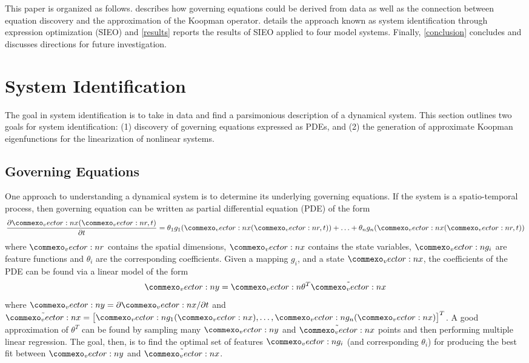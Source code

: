 \documentclass{article}
\renewcommand{\vec}[1]{\vect{#1}}
\begin{document}
This paper is organized as follows.  describes how governing equations could be derived from data as well as the connection between equation discovery and the approximation of the Koopman operator.  details the approach known as system identification through expression optimization (SIEO) and \cref{results} reports the results of SIEO applied to four model systems. Finally, \cref{conclusion} concludes and discusses directions for future investigation. 



\section{System Identification}
\label{systemidentification}

The goal in system identification is to take in data and find a parsimonious description of a dynamical system. This section outlines two goals for system identification: (1) discovery of governing equations expressed as PDEs, and (2) the generation of approximate Koopman eigenfunctions for the linearization of nonlinear systems.

\subsection{Governing Equations}
One approach to understanding a dynamical system is to determine its underlying governing equations. If the system is a spatio-temporal process, then governing equation can be written as partial differential equation (PDE) of the form
\begin{equation}
    \frac{\partial \vec{x} (\vec{r},t)}{\partial t} = \theta_1 g_1(\vec{x}(\vec{r},t)) + \ldots + \theta_n g_n(\vec{x}(\vec{r},t))
\end{equation}
where $\vec{r}$ contains the spatial dimensions, $\vec{x}$ contains the state variables, $\vec{g}_i$ are feature functions and $\theta_i$ are the corresponding coefficients. Given a mapping $g_i$, and a state $\vec{x}$, the coefficients of the PDE can be found via a linear model of the form 
\begin{equation}
 \vec{y} = \vec{\theta}^T \tilde{\vec{x}}
 \end{equation}
where $\vec{y} = \partial \vec{x}/ \partial t$ and $\tilde{\vec{x}} = \begin{bmatrix} \vec{g}_1(\vec{x}), \ldots, \vec{g}_n(\vec{x}) \end{bmatrix}^T$. A good approximation of $\theta^T$ can be found by sampling many $\vec{y}$ and $\tilde{\vec{x}}$ points and then performing multiple linear regression. The goal, then, is to find the optimal set of features $\vec{g}_i$ (and corresponding $\theta_i$) for producing the best fit between $\vec{y}$ and $\tilde{\vec{x}}$.
\end{document}
